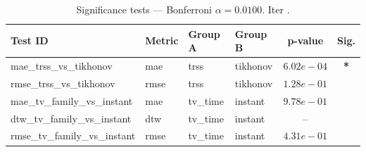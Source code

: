 ﻿%
\begin{table}[ht]
\centering
\caption[EEG reconstruction - Iteration it24]{Significance tests — Bonferroni $\alpha=0.0100$. Iter .}
\label{tab:sig_it24_physionet_all_scenarios}
\small
\begin{tabular}{llllcc}
\toprule
Test ID & Metric & Group A & Group B & p-value & Sig. \\
\midrule
mae\_trss\_vs\_tikhonov & mae & trss & tikhonov & $6.02e-04$ & \textbf{*} \\
rmse\_trss\_vs\_tikhonov & rmse & trss & tikhonov & $1.28e-01$ &  \\
mae\_tv\_family\_vs\_instant & mae & tv\_time & instant & $9.78e-01$ &  \\
dtw\_tv\_family\_vs\_instant & dtw & tv\_time & instant & -- &  \\
rmse\_tv\_family\_vs\_instant & rmse & tv\_time & instant & $4.31e-01$ &  \\
\bottomrule
\end{tabular}
\end{table}







